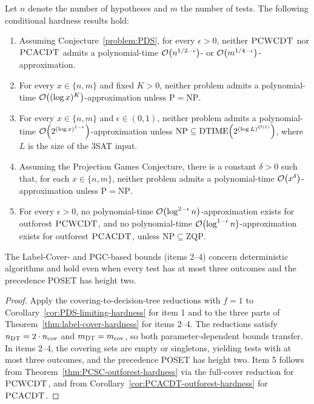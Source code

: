 \begin{corollary}\label{cor:decision-tree-inapproximability}
    \setlength{\emergencystretch}{3em}
    Let $n$ denote the number of hypotheses and $m$ the number of tests. The following conditional hardness results hold:
    \begin{enumerate}
        \item Assuming Conjecture~\ref{problem:PDS}, for every $\epsilon>0$, neither $\textup{\textsc{PCWCDT}}$ nor $\textup{\textsc{PCACDT}}$ admits a polynomial-time $\mathcal{O}\mathopen{}\left( n^{1/2-\epsilon} \right)$- or $\mathcal{O}\mathopen{}\left( m^{1/4-\epsilon} \right)$-approximation.
        \item For every $x\in\{n,m\}$ and fixed $K>0$, neither problem admits a polynomial-time $\mathcal{O}\mathopen{}\left( (\log x)^K \right)$-approximation unless $\mathrm{P}=\mathrm{NP}$.
        \item For every $x\in\{n,m\}$ and $\epsilon\in(0,1)$, neither problem admits a polynomial-time $\mathcal{O}\mathopen{}\left( 2^{(\log x)^{1-\epsilon}} \right)$-approximation unless $\mathrm{NP}\subseteq\mathrm{DTIME}\mathopen{}\left( 2^{(\log L)^{\mathcal{O}(1)}} \right)$, where $L$ is the size of the 3SAT input.
        \item Assuming the Projection Games Conjecture, there is a constant $\delta>0$ such that, for each $x\in\{n,m\}$, neither problem admits a polynomial-time $\mathcal{O}\mathopen{}\left( x^\delta \right)$-approximation unless $\mathrm{P}=\mathrm{NP}$.
        \item For every $\epsilon>0$, no polynomial-time $\mathcal{O}\mathopen{}\left( \log^{2-\epsilon}n \right)$-approximation exists for outforest $\textup{\textsc{PCWCDT}}$, and no polynomial-time $\mathcal{O}\mathopen{}\left( \log^{1-\epsilon}n \right)$-approximation exists for outforest $\textup{\textsc{PCACDT}}$, unless $\mathrm{NP}\subseteq\mathrm{ZQP}$.
    \end{enumerate}
    The Label-Cover- and PGC-based bounds (items 2--4) concern deterministic algorithms and hold even when every test has at most three outcomes and the precedence POSET has height two.
\end{corollary}
\begin{proof}
    Apply the covering-to-decision-tree reductions with $f=1$ to Corollary~\ref{cor:PDS-limiting-hardness} for item 1 and to the three parts of Theorem~\ref{thm:label-cover-hardness} for items 2--4. The reductions satisfy $n_{\rm DT}=2\cdot n_{\rm cov}$ and $m_{\rm DT}=m_{\rm cov}$, so both parameter-dependent bounds transfer. In items 2--4, the covering sets are empty or singletons, yielding tests with at most three outcomes, and the precedence POSET has height two. Item 5 follows from Theorem~\ref{thm:PCSC-outforest-hardness} via the full-cover reduction for $\textup{\textsc{PCWCDT}}$, and from Corollary~\ref{cor:PCACDT-outforest-hardness} for $\textup{\textsc{PCACDT}}$.
\end{proof}

